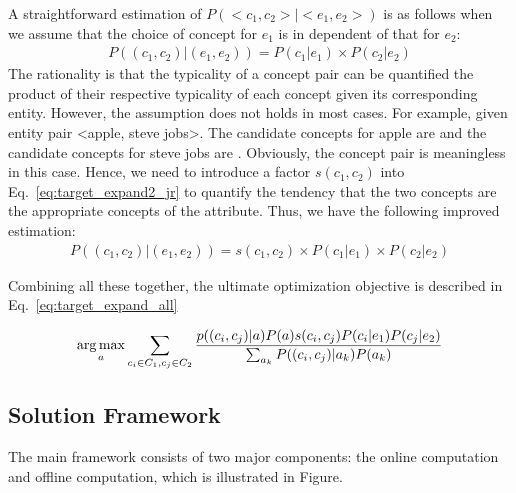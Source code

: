 A straightforward estimation of $P(<c_{1},c_{2}>|<e_{1},e_{2}>)$ is as follows when we assume that the choice of concept for $e_1$ is in dependent of that for $e_2$:
\begin{equation}
\label{eq:target_expand2_naive}
\begin{split}
P((c_{1},c_{2})|(e_{1},e_{2})) = P(c_1|e_1) \times P(c_2|e_2)
\end{split}
\end{equation} The rationality is that the typicality of a concept pair can be quantified the product of their respective typicality of each concept given its corresponding entity.
However, the assumption does not holds in most cases. For example, given entity pair \ac{<apple, steve jobs>}. The candidate concepts for \ac{apple} are  and the candidate concepts for \ac{steve jobs} are . Obviously, the concept pair  is meaningless in this case. Hence, we need to introduce a factor $s(c_1,c_2)$ into Eq.~\ref{eq:target_expand2_jr} to quantify the tendency that the two concepts are the appropriate concepts of the attribute. Thus, we have the following improved estimation:
\begin{equation}
\label{eq:target_expand2_jr}
\begin{split}
P((c_{1},c_{2})|(e_{1},e_{2})) = s(c_1,c_2) \times P(c_1|e_1) \times P(c_2|e_2)
\end{split}
\end{equation}


Combining all these together, the ultimate optimization objective is described in Eq.~\ref{eq:target_expand_all}

\begin{equation}
\label{eq:target_expand_all}
\begin{split}
 \operatorname*{arg\,max}_a \sum_{c_i\in C_1, c_j\in C_2}\frac{ p((c_{i},c_{j})|a) P(a) s(c_i,c_j) P(c_i|e_1) P(c_j|e_2) }{ \sum_{a_k}{P( (c_{i},c_{j})|a_k) P(a_k)   } }
\end{split}
\end{equation}



\subsection{Solution Framework}
The main framework consists of two major components: the online computation and offline computation, which is illustrated in Figure. 

